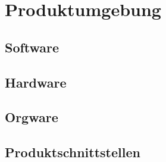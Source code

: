 \chapter{Produktumgebung}

\section{Software}

\section{Hardware}

\section{Orgware}

\section{Produktschnittstellen}